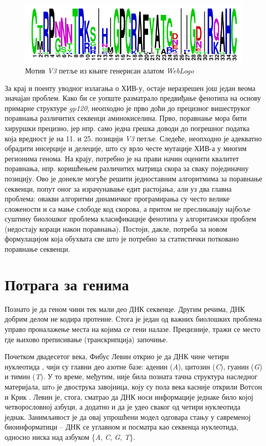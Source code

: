 \documentclass[12pt,oneside]{memoir}
\begin{document}
\begin{CJK}{UTF8}{ipxm}
\begin{figure}[H]
  \centering
  \includegraphics[width=.75\textwidth]{motif.png}
  \caption{Мотив \textit{V3} петље из књиге \cite{compeau2015} генерисан алатом \textit{WebLogo} \cite{weblogo}}
  \label{fig:motif}
\end{figure}

За крај и поенту уводног излагања о ХИВ-у, остаје неразрешен још један веома значајан проблем. Како би се уопште разматрало предвиђање фенотипа на основу примарне структуре \textit{gp120}, неопходно је прво доћи до прецизног вишеструког поравнања различитих секвенци аминокиселина. Прво, поравнање мора бити хируршки прецизно, јер нпр. само једна грешка доводи до погрешног податка која вредност је на 11. и 25. позицији \textit{V3} петље. Следеће, неопходно је адекватно обрадити инсерције и делеције, што су врло честе мутације ХИВ-а у многим регионима генома. На крају, потребно је на прави начин оценити квалитет поравнања, нпр. коришћењем различитих матрица скора за сваку појединачну позицију. Ово је донекле могуће решити једноставним алгоритмима за поравнање секвенци, попут оног за израчунавање едит растојања, али уз два главна проблема: овакви алгоритми динамичког програмирања су често велике сложености и са мање слободе код скорова, а притом не пресликавају најбоље суштину биолошког проблема класификације фенотипа у алгоритамски проблем (недостају кораци након поравнања). Постоји, дакле, потреба за новом формулацијом која обухвата све што је потребно за статистички потковано поравнање секвенци.

\section{Потрага за генима}
Познато је да геном чини тек мали део ДНК секвенце. Другим речима, ДНК добрим делом не кодира протеине. Стога је један од важних биолошких проблема управо проналажење места на којима се гени налазе. Прецизније, тражи се место где њихово преписивање (транскрипција) започиње.

Почетком двадесетог века, Фибус Левин открио је да ДНК чине четири нуклеотида \cite{levene1910}, чији су главни део азотне базе: аденин (\textit{A}), цитозин (\textit{C}), гуанин (\textit{G}) и тимин (\textit{T}). У то време, међутим, није била позната тачна структура наследног материјала, штo је двострука завојница, коју су пола века касније открили Вотсон и Крик \cite{watson1953}. Левин је, стога, сматрао да ДНК носи информације једнаке било којој четворословној азбуци, а додатно и да је удео сваког од четири нуклеотида једнак. Занимљивост је да овај упрошћени модел одговара стању у савременој биоинформатици -- ДНК се углавном и посматра као секвенца нуклеотида, односно ниска над азбуком \{\textit{A}, \textit{C}, \textit{G}, \textit{T}\}.


\end{CJK}
\end{document}
